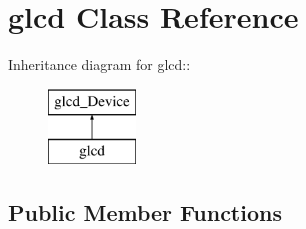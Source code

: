 \hypertarget{classglcd}{
\section{glcd Class Reference}
\label{classglcd}
}
Inheritance diagram for glcd::\begin{figure}[H]
\begin{center}
\leavevmode
\includegraphics[height=2cm]{classglcd}
\end{center}
\end{figure}
\subsection*{Public Member Functions}
